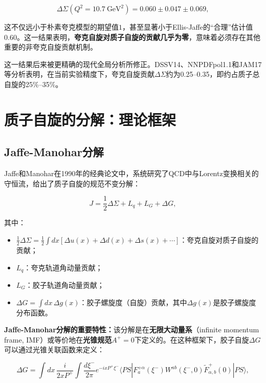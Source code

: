 \documentclass[12pt,a4paper]{ctexart}
\theoremstyle{definition}
\begin{document}
\begin{equation}
\Delta\Sigma(Q^2 = 10.7\ \text{GeV}^2) = 0.060 \pm 0.047 \pm 0.069,
\label{eq:EMC_result}
\end{equation}

这不仅远小于朴素夸克模型的期望值$1$，甚至显著小于Ellis-Jaffe的``合理''估计值$0.60$。这一结果表明，\textbf{夸克自旋对质子自旋的贡献几乎为零}，意味着必须存在其他重要的非夸克自旋贡献机制。

这一结果后来被更精确的现代全局分析所修正。DSSV14\cite{DSSV14}、NNPDFpol1.1\cite{NNPDFpol11}和JAM17\cite{JAM17}等分析表明，在当前实验精度下，夸克自旋贡献$\Delta\Sigma$约为0.25--0.35，即约占质子总自旋的25\%--35\%。

\section{质子自旋的分解：理论框架}

\subsection{Jaffe-Manohar分解}

Jaffe和Manohar在1990年的经典论文\cite{JaffeManohar1990}中，系统研究了QCD中与Lorentz变换相关的守恒流，给出了质子自旋的规范不变分解：

\begin{equation}
J = \frac{1}{2}\Delta\Sigma + L_q + L_G + \Delta G,
\label{eq:JM_decomposition}
\end{equation}

其中：
\begin{itemize}
    \item $\frac{1}{2}\Delta\Sigma = \frac{1}{2}\int dx \left[\Delta u(x) + \Delta d(x) + \Delta s(x) + \cdots \right]$：夸克自旋对质子自旋的贡献；
    \item $L_q$：夸克轨道角动量贡献；
    \item $L_G$：胶子轨道角动量贡献；
    \item $\Delta G = \int dx\, \Delta g(x)$：胶子螺旋度（自旋）贡献，其中$\Delta g(x)$是胶子螺旋度分布函数。
\end{itemize}

\textbf{Jaffe-Manohar分解的重要特性：}该分解是在\textbf{无限大动量系}（infinite momentum frame, IMF）或等价地在\textbf{光锥规范}$A^+ = 0$下定义的。在这种框架下，胶子自旋$\Delta G$可以通过光锥关联函数来定义：

\begin{equation}
\Delta G = \int dx\, \frac{i}{2xP^+} \int \frac{d\xi^-}{2\pi} e^{-ixP^+\xi^-} \langle PS| F^{+\alpha}_a(\xi^-) W^{ab}(\xi^-, 0) \tilde{F}^+_{\alpha,b}(0) |PS\rangle,
\label{eq:DeltaG_definition}
\end{equation}
\end{document}
